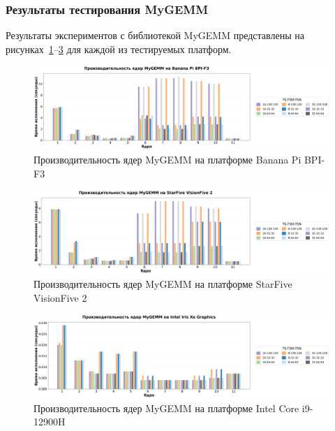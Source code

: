 \subsubsection{Результаты тестирования MyGEMM}

Результаты экспериментов с библиотекой MyGEMM представлены на рисунках~\ref{fig:perf_bananapi}--\ref{fig:perf_intelxe} для каждой из тестируемых платформ.

\begin{figure}[H]
\centering
\includegraphics[width=1\textwidth]{figures/banana_pi.png}
\caption{Производительность ядер MyGEMM на платформе Banana Pi BPI-F3}
\label{fig:perf_bananapi}
\end{figure}

\begin{figure}[H]
\centering
\includegraphics[width=1\textwidth]{figures/starfive.png}
\caption{Производительность ядер MyGEMM на платформе StarFive VisionFive 2}
\label{fig:perf_starfive}
\end{figure}

\begin{figure}[H]
\centering
\includegraphics[width=1\textwidth]{figures/intel_xe.png}
\caption{Производительность ядер MyGEMM на платформе Intel Core i9-12900H}
\label{fig:perf_intelxe}
\end{figure}

